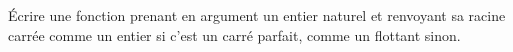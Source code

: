 \question \'Ecrire une fonction  prenant en argument un entier naturel  et renvoyant sa racine carrée comme un entier si c'est un carré parfait, comme un flottant sinon.